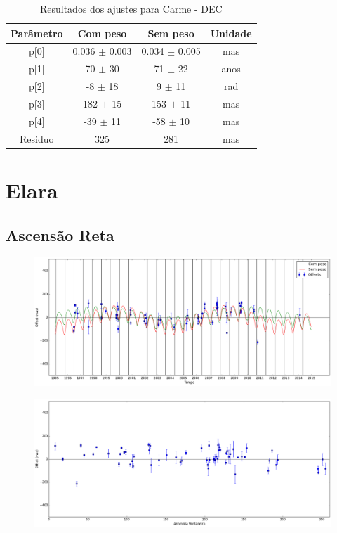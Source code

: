 \documentclass[11pt,a4paper]{report}
\begin{document}
\begin{table}[h!]
\caption{\label{Tab: Carme-DEC} Resultados dos ajustes para Carme - DEC}
\begin{centering}
\begin{tabular}{cccc}
\hline
\hline
Parâmetro & Com peso & Sem peso & Unidade\tabularnewline
\hline
p[0] & 0.036 $\pm$ 0.003 & 0.034 $\pm$ 0.005 & mas\\
p[1] & 70 $\pm$ 30 & 71 $\pm$ 22 & anos\\
p[2] & -8 $\pm$ 18 & 9 $\pm$ 11 & rad\\
p[3] & 182 $\pm$ 15 & 153 $\pm$ 11 & mas\\
p[4] & -39 $\pm$ 11 & -58 $\pm$ 10 & mas\\
Residuo & 325 & 281 & mas\\
\hline 
\end{tabular} 
\par\end{centering}
\end{table}

\chapter*{Elara}
\section*{Ascensão Reta}

\begin{figure}[h]
\includegraphics[scale=0.35]{Elara/RA.png} 
\end{figure}

\begin{figure}[h]
\includegraphics[scale=0.35]{Elara/RA_anom.png}  
\end{figure}
\end{document}
